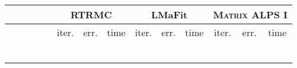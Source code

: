 \documentclass[twocolumn]{svjour3}
\begin{document}
\begin{table*}[!htp]
\begin{center}
\begin{tabular}{|c|c|c|c|c|c|c|c|c|c|c|c|c|c|}
\hline \hline \hline
\multicolumn{4}{c|}{} & & \multicolumn{3}{|c|}{RTRMC} & \multicolumn{3}{|c|}{LMaFit} & \multicolumn{3}{|c}{\textsc{Matrix ALPS I}} \\
\hline \hline
\multicolumn{1}{c}{} & \multicolumn{1}{c}{} & \multicolumn{1}{c}{} & \multicolumn{1}{c|}{} & & 
\multicolumn{1}{|c}{\rm{iter.}} & \multicolumn{1}{c}{\rm{err.}} & \multicolumn{1}{c|}{\rm{time}} &
\multicolumn{1}{|c}{\rm{iter.}} & \multicolumn{1}{c}{\rm{err.}} & \multicolumn{1}{c|}{\rm{time}} &
\multicolumn{1}{|c}{\rm{iter.}} & \multicolumn{1}{c}{\rm{err.}} & \multicolumn{1}{c}{\rm{time}} \\
\hline\hline
\multicolumn{1}{c}{} & \multicolumn{1}{c}{} & \multicolumn{1}{c}{} & \multicolumn{1}{c|}{} &  & 
\multicolumn{1}{|c}{} & \multicolumn{1}{c}{} & \multicolumn{1}{c|}{} &
\multicolumn{1}{|c}{} & \multicolumn{1}{c}{} & \multicolumn{1}{c|}{} &
\multicolumn{1}{|c}{} & \multicolumn{1}{c}{} & \multicolumn{1}{c}{} \\
\hline
\multicolumn{1}{c}{} & \multicolumn{1}{c}{} & \multicolumn{1}{c}{} & \multicolumn{1}{c|}{} &  & 
\multicolumn{1}{|c}{} & \multicolumn{1}{c}{} & \multicolumn{1}{c|}{} &
\multicolumn{1}{|c}{} & \multicolumn{1}{c}{} & \multicolumn{1}{c|}{} &
\multicolumn{1}{|c}{} & \multicolumn{1}{c}{} & \multicolumn{1}{c}{} \\
\hline
\multicolumn{1}{c}{} & \multicolumn{1}{c}{} & \multicolumn{1}{c}{} & \multicolumn{1}{c|}{} &  & 
\multicolumn{1}{|c}{} & \multicolumn{1}{c}{} & \multicolumn{1}{c|}{} &
\multicolumn{1}{|c}{} & \multicolumn{1}{c}{} & \multicolumn{1}{c|}{} &
\multicolumn{1}{|c}{} & \multicolumn{1}{c}{} & \multicolumn{1}{c}{} \\
\hline
\multicolumn{1}{c}{} & \multicolumn{1}{c}{} & \multicolumn{1}{c}{} & \multicolumn{1}{c|}{} &  & 
\multicolumn{1}{|c}{} & \multicolumn{1}{c}{} & \multicolumn{1}{c|}{} &
\multicolumn{1}{|c}{} & \multicolumn{1}{c}{} & \multicolumn{1}{c|}{} &
\multicolumn{1}{|c}{} & \multicolumn{1}{c}{} & \multicolumn{1}{c}{} \\
\hline
\multicolumn{1}{c}{} & \multicolumn{1}{c}{} & \multicolumn{1}{c}{} & \multicolumn{1}{c|}{} &  & 
\multicolumn{1}{|c}{} & \multicolumn{1}{c}{} & \multicolumn{1}{c|}{} &
\multicolumn{1}{|c}{} & \multicolumn{1}{c}{} & \multicolumn{1}{c|}{} &
\multicolumn{1}{|c}{} & \multicolumn{1}{c}{} & \multicolumn{1}{c}{} \\
\hline
\multicolumn{1}{c}{} & \multicolumn{1}{c}{} & \multicolumn{1}{c}{} & \multicolumn{1}{c|}{} &  & 
\multicolumn{1}{|c}{} & \multicolumn{1}{c}{} & \multicolumn{1}{c|}{} &

\end{tabular}
\end{center}
\end{table*}
\end{document}
